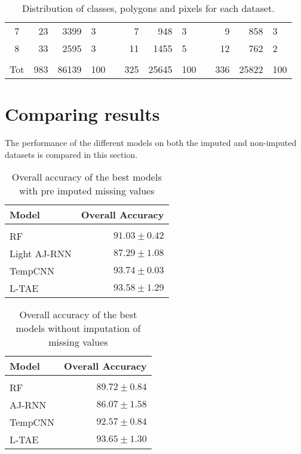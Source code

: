 \begin{table}[H]
\begin{tabular}{crrlcrrlcrrl}
    7     & 23                      & 3399                      & 3   &                      & 7                       & 948   & 3                       &                      & 9      & 858     & 3     \\
    8     & 33                      & 2595                      & 3   &                      & 11                      & 1455  & 5                       &                      & 12     & 762     & 2     \\[0.2cm]\hline \\[-0.2cm]
    Tot   & \multicolumn{1}{l}{983} & \multicolumn{1}{l}{86139} & 100 & \multicolumn{1}{l}{} & \multicolumn{1}{l}{325} & 25645 & \multicolumn{1}{l}{100} & \multicolumn{1}{l}{} & 336    & 25822   & 100       
  \end{tabular}
  \caption{Distribution of classes, polygons and pixels for each dataset.}
  \label{tab:dataset-splits}
\end{table}


\pagebreak

\pagebreak

\pagebreak

\pagebreak

\section{Comparing results}

The performance of the different models on both the imputed and non-imputed datasets is compared in this section.

\begin{table}[H]
  \centering
    \begin{tabular}{lr}
    Model                       & Overall Accuracy             \\[0.2cm] 
    \hline \\[-0.2cm]
    RF            & $91.03 \pm 0.42$\\
    Light AJ-RNN  & $87.29 \pm 1.08$\\
    TempCNN       & $93.74 \pm 0.03$\\
    L-TAE         & $93.58 \pm 1.29$
    \end{tabular}
  \caption{Overall accuracy of the best models with pre imputed missing values}
  \label{tab:ALLresultsImputed} 
\end{table}

\begin{table}[H]
  \centering
    \begin{tabular}{lr}
    Model                       & Overall Accuracy             \\[0.2cm] 
    \hline \\[-0.2cm]
    RF      & $89.72 \pm 0.84$\\
    AJ-RNN  & $86.07 \pm 1.58$\\
    TempCNN & $92.57 \pm 0.84$\\
    L-TAE   & $93.65 \pm 1.30$
    \end{tabular}
  \caption{Overall accuracy of the best models without imputation of missing values} 
  \label{tab:ALLresultsNoImputed}
\end{table}

